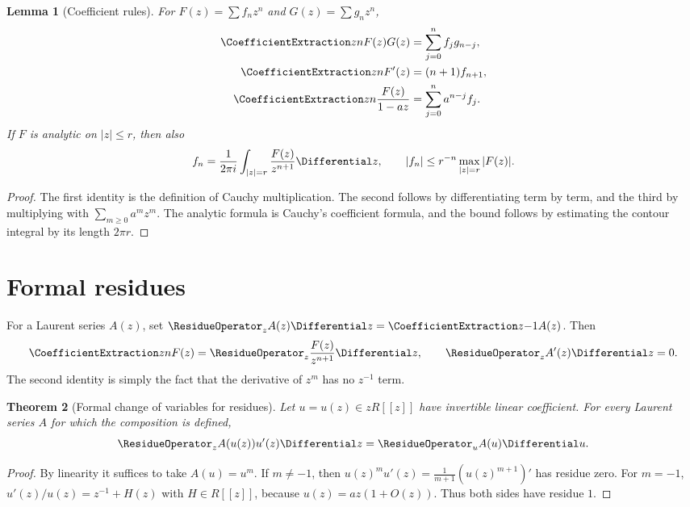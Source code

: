 \documentclass[11pt,a4paper,oneside,openany]{book}
\newtheorem{theorem}{Theorem}[chapter]
\newtheorem{lemma}[theorem]{Lemma}
\theoremstyle{definition}
\theoremstyle{remark}
\begin{document}
\begin{lemma}[Coefficient rules]\label{lem:coeff-rules}
For $F(z)=\sum f_nz^n$ and $G(z)=\sum g_nz^n$,
\begin{align}
 \CoefficientExtraction z n F(z)G(z)&=\sum_{j=0}^n f_jg_{n-j},\label{eq:cauchy}\\
 \CoefficientExtraction z n F'(z)&=(n+1)f_{n+1},\label{eq:der-coeff}\\
 \CoefficientExtraction z n \frac{F(z)}{1-az}&=\sum_{j=0}^n a^{n-j}f_j.\label{eq:geom-conv}
\end{align}
If $F$ is analytic on $|z|\le r$, then also
\begin{equation}\label{eq:cauchy-coeff}
 f_n=\frac{1}{2\pi i}\int_{|z|=r}\frac{F(z)}{z^{n+1}}\Differential z,
 \qquad |f_n|\le r^{-n}\max_{|z|=r}|F(z)|.
\end{equation}
\end{lemma}
\begin{proof}
The first identity is the definition of Cauchy multiplication.  The second follows
by differentiating term by term, and the third by multiplying with
$\sum_{m\ge0}a^mz^m$.  The analytic formula is Cauchy's coefficient formula, and the
bound follows by estimating the contour integral by its length $2\pi r$.
\end{proof}

\section{Formal residues}
For a Laurent series $A(z)$, set
$\ResidueOperator_z A(z)\Differential z=\CoefficientExtraction z{-1}A(z)$.  Then
\begin{equation}\label{eq:res-coeff}
 \CoefficientExtraction z n F(z)=\ResidueOperator_z\frac{F(z)}{z^{n+1}}\Differential z,
 \qquad \ResidueOperator_z A'(z)\Differential z=0.
\end{equation}
The second identity is simply the fact that the derivative of $z^m$ has no
$z^{-1}$ term.

\begin{theorem}[Formal change of variables for residues]\label{thm:res-subst}
Let $u=u(z)\in zR[[z]]$ have invertible linear coefficient.  For every Laurent series
$A$ for which the composition is defined,
\begin{equation}\label{eq:formal-res-subst}
 \ResidueOperator_z A(u(z))u'(z)\Differential z=\ResidueOperator_u A(u)\Differential u.
\end{equation}
\end{theorem}
\begin{proof}
By linearity it suffices to take $A(u)=u^m$.  If $m\ne-1$, then
$u(z)^mu'(z)=\frac{1}{m+1}(u(z)^{m+1})'$ has residue zero.  For $m=-1$,
$u'(z)/u(z)=z^{-1}+H(z)$ with $H\in R[[z]]$, because
$u(z)=az(1+O(z))$.  Thus both sides have residue $1$.
\end{proof}
\end{document}

